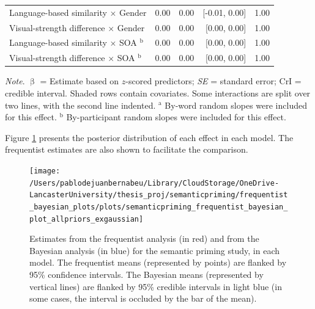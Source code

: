\documentclass[
  12pt,
  man,floatsintext]{apa7}
\begin{document}
\begin{table}[!h]
\begin{threeparttable}
\begin{tabular}[t]{lrrrr}
\hspace{1em}Language-based similarity  $\times$  Gender & 0.00 & 0.00 & {}[-0.01, 0.00] & 1.00\\
\hspace{1em}Visual-strength difference  $\times$  Gender & 0.00 & 0.00 & {}[0.00, 0.00] & 1.00\\
\hspace{1em}Language-based similarity  $\times$  SOA $^{\text{b}}$ & 0.00 & 0.00 & {}[0.00, 0.00] & 1.00\\
\hspace{1em}Visual-strength difference  $\times$  SOA $^{\text{b}}$ & 0.00 & 0.00 & {}[0.00, 0.00] & 1.00\\
\bottomrule
\end{tabular}
\begin{tablenotes}
\item \textit{\linebreak} 
\item \textit{Note}. $\upbeta$ = Estimate based on $z$-scored predictors; \textit{SE} = standard error; \linebreak \phantom{.}CrI = credible interval. Shaded rows contain covariates. Some interactions \linebreak \phantom{.}are split over two lines, with the second line indented. \linebreak \linebreak \phantom{.}$^{\text{a}}$ By-word random slopes were included for this effect. \linebreak \phantom{.}$^{\text{b}}$ By-participant random slopes were included for this effect.
\end{tablenotes}
\end{threeparttable}
\end{table}

\clearpage

Figure \ref{fig:semanticpriming-frequentist-bayesian-plot-allpriors-exgaussian} presents the posterior distribution of each effect in each model. The frequentist estimates are also shown to facilitate the comparison.

\begin{figure}

{\centering \texttt{[image: /Users/pablodejuanbernabeu/Library/CloudStorage/OneDrive-LancasterUniversity/thesis\_proj/semanticpriming/frequentist\_bayesian\_plots/plots/semanticpriming\_frequentist\_bayesian\_plot\_allpriors\_exgaussian]} 

}

\caption{Estimates from the frequentist analysis (in red) and from the Bayesian analysis (in blue) for the semantic priming study, in each model. The frequentist means (represented by points) are flanked by 95\% confidence intervals. The Bayesian means (represented by vertical lines) are flanked by 95\% credible intervals in light blue (in some cases, the interval is occluded by the bar of the mean).}\label{fig:semanticpriming-frequentist-bayesian-plot-allpriors-exgaussian}
\end{figure}
\end{document}
